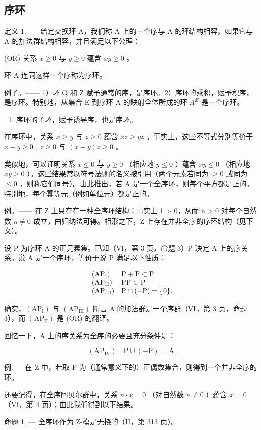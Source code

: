 \subsection{序环}

定义 1.——给定交换环 A，我们称 A 上的一个序与 A 的环结构相容，如果它与 A 的加法群结构相容，并且满足以下公理：

(OR) 关系 \(x \geqslant 0\) 与 \(y \geqslant 0\) 蕴含 \(xy \geqslant 0\) 。

环 A 连同这样一个序称为序环。

例子。—— 1）环 Q 和 Z 赋予通常的序，是序环。2）序环的乘积，赋予积序，是序环。特别地，从集合 E 到序环 A 的映射全体所成的环 \(A^{E}\) 是一个序环。

\begin{enumerate}
\def\labelenumi{\arabic{enumi})}
\setcounter{enumi}{2}
\tightlist
\item
  序环的子环，赋予诱导序，也是序环。
\end{enumerate}

在序环中，关系 \(x \geqslant y\) 与 \(z \geqslant 0\) 蕴含 \(xz \geqslant yz\) 。事实上，这些不等式分别等价于 \(x - y \geqslant 0\) , \(z \geqslant 0\) 与 \((x - y)z \geqslant 0\) 。

类似地，可以证明关系 \(x \leqslant 0\) 与 \(y \geqslant 0\) （相应地 \(y \leqslant 0\) ）蕴含 \(xy \leqslant 0\) （相应地 \(xy \geqslant 0\) ）。这些结果常以符号法则的名义被引用（两个元素若同为 \(\geqslant 0\) 或同为 \(\leqslant 0\) ，则称它们同号）。由此推出，若 A 是一个全序环，则每个平方都是正的，特别地，每个幂等元（例如单位元）都是正的。

例。—— 在 Z 上只存在一种全序环结构：事实上 1 \textgreater{} 0，从而 n \textgreater{} 0 对每个自然数 \(n \neq 0\) 成立，由归纳法可得。相形之下，Z 上存在并非全序的序环结构（见下文）。

设 P 为序环 A 的正元素集。已知（VI，第 3 页，命题 3）P 决定 A 上的序关系。说 A 是一个序环，等价于说 P 满足以下性质：

\[
\begin{array}{l l} \left(\mathrm{AP} _ {\mathrm{I}}\right) & \mathrm{P} + \mathrm{P} \subset \mathrm{P} \\ \left(\mathrm{AP} _ {\mathrm{II}}\right) & \mathrm{PP} \subset \mathrm{P} \\ \left(\mathrm{AP} _ {\mathrm{III}}\right) & \mathrm{P} \cap (- \mathrm{P}) = \{0 \}. \end{array}
\]

确实，\((\mathrm{AP}_{\mathrm{I}})\) 与 \((\mathrm{AP}_{\mathrm{III}})\) 断言 A 的加法群是一个序群（VI，第 3 页，命题 3），而 \((\mathrm{AP}_{\mathrm{II}})\) 是 (OR) 的翻译。

回忆一下，A 上的序关系为全序的必要且充分条件是：

\[
\left(\mathrm{AP} _ {\mathrm{IV}}\right) \quad \mathrm{P} \cup (- \mathrm{P}) = \mathrm{A}.
\]

例. --- 在 Z 中，若取 P 为（通常意义下的）正偶数集合，则得到一个并非全序的环。

还要记得，在全序阿贝尔群中，关系 \(n \cdot x = 0\) （对自然数 \(n \neq 0\) ）蕴含 \(x = 0\) （VI，第 4 页）；由此我们得到以下结果。

命题 1. --- 全序环作为 Z-模是无挠的（II，第 313 页）。

